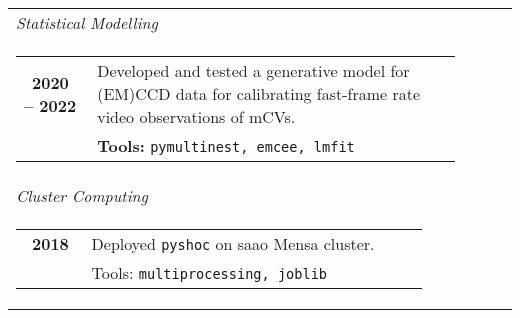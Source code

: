 \documentclass{article}
\newcommand{\tb}{\textbullet}
\newcommand{\saao}{\gls*{saao}\xspace}
\begin{document}
\begin{tabular}{l l}
  \emph{\large Statistical Modelling} 
  \\
  \multicolumn{2}{c}{\parbox{0.95\textwidth}{
    \begin{tabular}{p{0.15\linewidth}p{0.75\linewidth}}
      \tb \ {\bf 2020 -- 2022}
      & {Developed and tested a generative model for (EM)CCD data
         for calibrating fast-frame rate video observations of mCVs. } \\
      & {\bf Tools:} {\tt pymultinest, emcee, lmfit}                  \\
    \end{tabular}
  }}
  \\
  
  \emph{\large Cluster Computing}
  \\
  \multicolumn{2}{c}{\parbox{0.95\textwidth}{
    \begin{tabular}{p{0.15\linewidth}p{0.75\linewidth}}
      \tb \ {\bf 2018}
        & Deployed {\tt pyshoc} on \saao Mensa cluster.    \\
        & Tools: {\tt multiprocessing, joblib}                \\
    \end{tabular}
  }}


\end{tabular}

  
\end{document}
